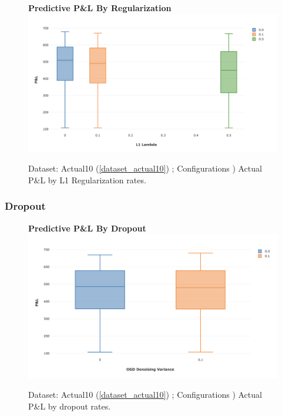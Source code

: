 \documentclass[a4paper,11pt,oneside]{article}
\theoremstyle{plain}
\theoremstyle{definition}
\begin{document}
\begin{figure}[H]
	\centering 
	\textbf{Predictive P\&L By Regularization}
	\includegraphics[scale=0.35]{images/results/network/ffn_l1_reg.png} 
	\caption{Dataset: Actual10 (\ref{dataset_actual10}) ; Configurations )
		\newline Actual P\&L by L1 Regularization rates.}
	\label{figure-ogd_reg}
\end{figure}


\subsubsection{Dropout}

\begin{figure}[H]
	\centering 
	\textbf{Predictive P\&L By Dropout}
	\includegraphics[scale=0.35]{images/results/network/ffn_dropout.png} 
	\caption{Dataset: Actual10 (\ref{dataset_actual10}) ; Configurations )
		\newline Actual P\&L by dropout rates.}
	\label{figure-ogd_dropout}
\end{figure}

\newpage
\end{document}
